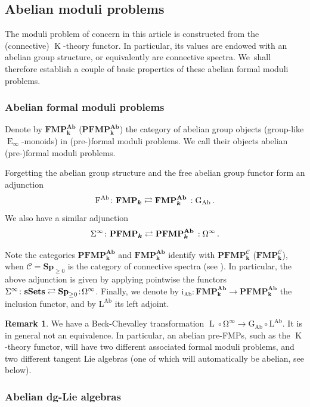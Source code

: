 \documentclass[JEP,XML,SOM,Unicode,NoEqCountersInSection]{cedram}
\let\mathcal\mathscr
\theoremstyle{definition}
\newtheorem{rmq}[thm]{Remark}
\newcommand{\noloc}{\mathchoice{\,:}{\!:\!}{:}{:}}
\newcommand{\Cc}{\mathcal{C}}
\newcommand{\sSets}{\mathbf{sSets}}
\newcommand{\Sp}{\mathbf{Sp}}
\DeclareMathOperator{\E}{E}
\DeclareMathOperator{\K}{K}
\newcommand{\FMP}{\mathbf{FMP}}
\newcommand{\infloop}{\operatorname{\Omega^\infty}}
\newcommand{\infsusp}{\operatorname{\Sigma^\infty}}
\newcommand{\FAb}{\operatorname{F^{Ab}}}
\newcommand{\GAb}{\operatorname{G_{Ab}}}
\newcommand{\Ab}{\mathbf{Ab}}
\renewcommand{\k}{{\boldsymbol{k}}}
\newcommand{\iAb}{\operatorname{i_{Ab}}}
\newcommand{\form}{\operatorname{L}}
\newcommand{\LAb}{\operatorname{L^{Ab}}}
\newcommand{\PFMP}{\mathbf{PFMP}}
\begin{document}
\subsection{Abelian moduli problems}\label{subsec:abelianfmp}

The moduli problem of concern in this article is constructed from the (connective) $\K$-theory functor. In particular, its values are endowed with an abelian group structure, or equivalently are connective spectra. We~shall therefore establish a couple of basic properties of these abelian formal moduli problems.

\subsubsection{Abelian formal moduli problems}
Denote by $\FMP_\k^\Ab$ (\resp $\PFMP_\k^\Ab$) the category of abelian group objects (\ie group-like $\E_\infty$-monoids) in (pre-)formal moduli problems.
We call their objects abelian (pre-)formal moduli problems.

Forgetting the abelian group structure and the free abelian group functor form an adjunction\vspace*{-3pt}
\[
\FAb \colon \FMP_\k \rightleftarrows \FMP_\k^\Ab \noloc \GAb.
\]
We also have a similar adjunction\vspace*{-5pt}
\[
\infsusp \colon \PFMP_\k \rightleftarrows \PFMP_\k^\Ab \noloc \infloop.
\]

Note the categories $\PFMP_\k^\Ab$ and $\FMP^\Ab_\k$ identify with $\PFMP_\k^\Cc$ (\resp $\FMP_\k^\Cc$), when $\Cc = \Sp_{\geq 0}$ is the category of connective spectra (see \cite[Rem.\,5.2.6.26]{lurie:halg}). In particular, the above adjunction is given by applying pointwise the functors $\infsusp \colon \sSets \rightleftarrows \Sp_{\geq 0} \noloc \infloop$. Finally, we denote by $\iAb \colon \FMP_\k^\Ab \to \PFMP_\k^\Ab$ the inclusion functor, and by $\LAb$ its left adjoint.

\begin{rmq}
We have a Beck-Chevalley transformation $\form \circ \operatorname{\infloop} \to \GAb \circ \LAb$. It is in general not an equivalence. In particular, an abelian pre-FMPs, such as the $\K$-theory functor, will have two different associated formal moduli problems, and two different tangent Lie algebras (one of which will automatically be abelian, see below).
\end{rmq}

\subsubsection{Abelian dg-Lie algebras}
\end{document}
